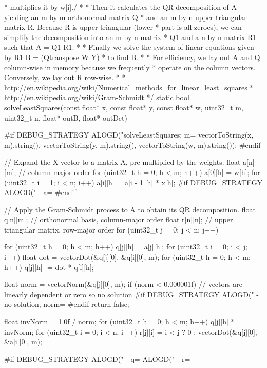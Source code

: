  * multiplies it by w[i]./
 *
 * Then it calculates the QR decomposition of A yielding an m by m orthonormal matrix Q
 * and an m by n upper triangular matrix R.  Because R is upper triangular (lower
 * part is all zeroes), we can simplify the decomposition into an m by n matrix
 * Q1 and a n by n matrix R1 such that A = Q1 R1.
 *
 * Finally we solve the system of linear equations given by R1 B = (Qtranspose W Y)
 * to find B.
 *
 * For efficiency, we lay out A and Q column-wise in memory because we frequently
 * operate on the column vectors.  Conversely, we lay out R row-wise.
 *
 * http://en.wikipedia.org/wiki/Numerical_methods_for_linear_least_squares
 * http://en.wikipedia.org/wiki/Gram-Schmidt
 */
static bool solveLeastSquares(const float* x, const float* y,
                              const float* w, uint32_t m, uint32_t n, float* outB, float* outDet) {
#if DEBUG_STRATEGY
    ALOGD("solveLeastSquares: m=%
          vectorToString(x, m).string(), vectorToString(y, m).string(),
          vectorToString(w, m).string());
#endif
    
    // Expand the X vector to a matrix A, pre-multiplied by the weights.
    float a[n][m]; // column-major order
    for (uint32_t h = 0; h < m; h++) {
        a[0][h] = w[h];
        for (uint32_t i = 1; i < n; i++) {
            a[i][h] = a[i - 1][h] * x[h];
        }
    }
#if DEBUG_STRATEGY
    ALOGD("  - a=%
#endif
    
    // Apply the Gram-Schmidt process to A to obtain its QR decomposition.
    float q[n][m]; // orthonormal basis, column-major order
    float r[n][n]; // upper triangular matrix, row-major order
    for (uint32_t j = 0; j < n; j++) {
        for (uint32_t h = 0; h < m; h++) {
            q[j][h] = a[j][h];
        }
        for (uint32_t i = 0; i < j; i++) {
            float dot = vectorDot(&q[j][0], &q[i][0], m);
            for (uint32_t h = 0; h < m; h++) {
                q[j][h] -= dot * q[i][h];
            }
        }
        
        float norm = vectorNorm(&q[j][0], m);
        if (norm < 0.000001f) {
            // vectors are linearly dependent or zero so no solution
#if DEBUG_STRATEGY
            ALOGD("  - no solution, norm=%
#endif
            return false;
        }
        
        float invNorm = 1.0f / norm;
        for (uint32_t h = 0; h < m; h++) {
            q[j][h] *= invNorm;
        }
        for (uint32_t i = 0; i < n; i++) {
            r[j][i] = i < j ? 0 : vectorDot(&q[j][0], &a[i][0], m);
        }
    }
#if DEBUG_STRATEGY
    ALOGD("  - q=%
    ALOGD("  - r=%
    
}
